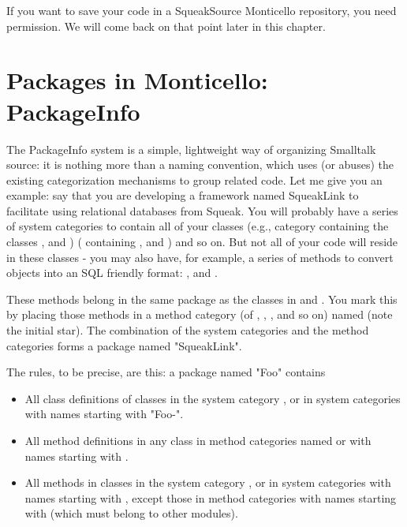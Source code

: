 \documentclass[a4paper,10pt,twoside]{book}
\begin{document}
If you want to save your code in a SqueakSource Monticello repository, you need permission. We will come back on that point later in this chapter.



\section{Packages in Monticello: PackageInfo}

The PackageInfo system is a simple, lightweight way of organizing Smalltalk source: it is nothing more than a naming convention, which uses (or abuses) the existing categorization mechanisms to group related code. Let me give you an example: say that you are developing a framework named SqueakLink to facilitate using relational databases from Squeak. You will probably have a series of system categories to contain all of your classes (e.g., category  containing the classes ,  and )
( containing ,   and ) and so on. But not all of your code will reside in these classes - you may also have, for example, a series of methods to convert objects into an SQL friendly format: ,   and .

These methods belong in the same package as the classes in  and . You mark this by placing those methods in a method category (of , , , and so on) named  (note the initial star). The combination of the  system categories and the  method categories forms a package named "SqueakLink".

The rules, to be precise, are this: a package named "Foo" contains

\begin{itemize}
\item All class definitions of classes in the system category , or in system categories with names starting with "Foo-".
\item All method definitions in any class in method categories named  or with names starting with .
\item All methods in classes in the system category , or in system categories with names starting with , except those in method categories with names starting with \cat{*} (which must belong to other modules).
\end{itemize}
\end{document}
